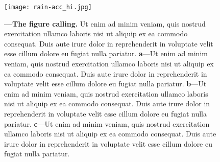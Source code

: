 \begin{figure}[t!] %
\centering
\texttt{[image: rain-acc\_hi.jpg]}		
\caption[Caption for display in the LOF]
{
    \textbf{ ---\;The figure calling.}
    Ut enim ad minim veniam, quis nostrud exercitation ullamco laboris nisi ut aliquip ex ea commodo consequat. Duis aute irure dolor in reprehenderit in voluptate velit esse cillum dolore eu fugiat nulla pariatur.
    \;\textbf{a}\;---\;Ut enim ad minim veniam, quis nostrud exercitation ullamco laboris nisi ut aliquip ex ea commodo consequat. Duis aute irure dolor in reprehenderit in voluptate velit esse cillum dolore eu fugiat nulla pariatur.
    \;\textbf{b}\;---\;Ut enim ad minim veniam, quis nostrud exercitation ullamco laboris nisi ut aliquip ex ea commodo consequat. Duis aute irure dolor in reprehenderit in voluptate velit esse cillum dolore eu fugiat nulla pariatur.
    \;\textbf{c}\;---\;Ut enim ad minim veniam, quis nostrud exercitation ullamco laboris nisi ut aliquip ex ea commodo consequat. Duis aute irure dolor in reprehenderit in voluptate velit esse cillum dolore eu fugiat nulla pariatur.
}
\label{fig:label} 		
\end{figure}